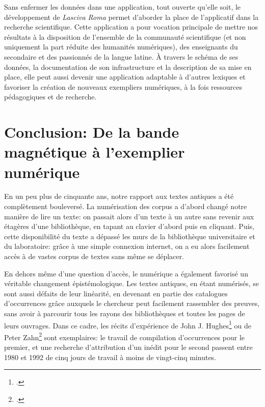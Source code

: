 Sans enfermer les données dans une application, tout ouverte qu'elle soit, le développement de \textit{Lasciva Roma} permet d'aborder la place de l'applicatif dans la recherche scientifique. Cette application a pour vocation principale de mettre nos résultats à la disposition de l'ensemble de la communauté scientifique (et non uniquement la part réduite des humanités numériques), des enseignants du secondaire et des passionnés de la langue latine. À travers le schéma de ses données, la documentation de son infrastructure et la description de sa mise en place, elle peut aussi devenir une application adaptable à d'autres lexiques et favoriser la création de nouveaux exempliers numériques, à la fois ressources pédagogiques et de recherche.

\clearpage
\section*{Conclusion: De la bande magnétique à l'exemplier numérique}

En un peu plus de cinquante ans, notre rapport aux textes antiques a été complètement bouleversé. La numérisation des corpus a d'abord changé notre manière de lire un texte: on passait alors d'un texte à un autre sans revenir aux étagères d'une bibliothèque, en tapant au clavier d'abord puis en cliquant. Puis, cette disponibilité du texte a dépassé les murs de la bibliothèque universitaire et du laboratoire: grâce à une simple connexion internet, on a eu alors facilement accès à de vastes corpus de textes sans même se déplacer.

En dehors même d'une question d'accès, le numérique a également favorisé un véritable changement épistémologique. Les textes antiques, en étant numérisés, se sont aussi défaits de leur linéarité, en devenant en partie des catalogues d'occurrences grâce auxquels le chercheur peut facilement rassembler des preuves, sans avoir à parcourir tous les rayons des bibliothèques  et toutes les pages de leurs ouvrages. Dans ce cadre, les récits d'expérience de John J. Hughes\footcite{helgerson_cd-rom_1988} ou de Peter Zahn\footcite[p. 427]{zahn_kirchenvater-texte_1992} sont exemplaires: le travail de compilation d'occurrences pour le premier, et une recherche d'attribution d'un inédit pour le second passent entre 1980 et 1992 de cinq jours de travail à moins de vingt-cinq minutes. 

